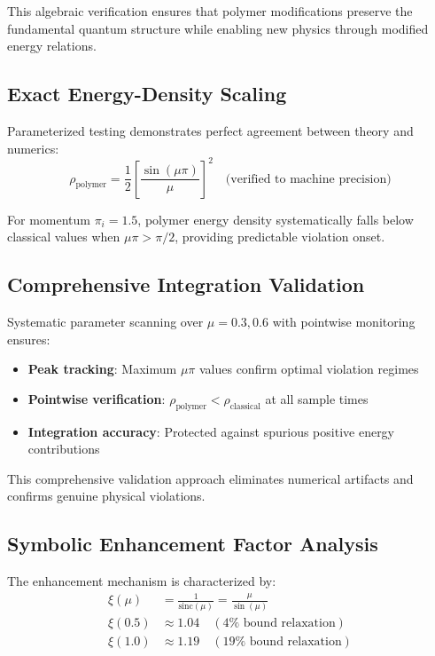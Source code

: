 \documentclass[12pt]{article}
\begin{document}
This algebraic verification ensures that polymer modifications preserve the fundamental quantum structure while enabling new physics through modified energy relations.

\subsection{Exact Energy-Density Scaling}

Parameterized testing demonstrates perfect agreement between theory and numerics:
\begin{equation}
\rho_{\text{polymer}} = \frac{1}{2}\left[\frac{\sin(\mu\pi)}{\mu}\right]^2 \quad \text{(verified to machine precision)}
\end{equation}

For momentum $\pi_i = 1.5$, polymer energy density systematically falls below classical values when $\mu\pi > \pi/2$, providing predictable violation onset.

\subsection{Comprehensive Integration Validation}

Systematic parameter scanning over $\mu = 0.3, 0.6$ with pointwise monitoring ensures:
\begin{itemize}
\item \textbf{Peak tracking}: Maximum $\mu\pi$ values confirm optimal violation regimes
\item \textbf{Pointwise verification}: $\rho_{\text{polymer}} < \rho_{\text{classical}}$ at all sample times
\item \textbf{Integration accuracy}: Protected against spurious positive energy contributions
\end{itemize}

This comprehensive validation approach eliminates numerical artifacts and confirms genuine physical violations.

\subsection{Symbolic Enhancement Factor Analysis}

The enhancement mechanism is characterized by:
\begin{align}
\xi(\mu) &= \frac{1}{\text{sinc}(\mu)} = \frac{\mu}{\sin(\mu)} \\
\xi(0.5) &\approx 1.04 \quad (4\% \text{ bound relaxation}) \\
\xi(1.0) &\approx 1.19 \quad (19\% \text{ bound relaxation})
\end{align}
\end{document}
